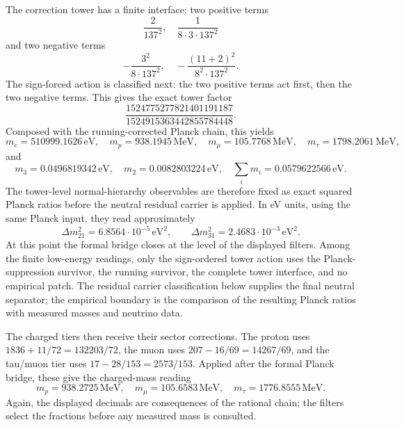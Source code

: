 \documentclass[11pt]{article}
\begin{document}
The correction tower has a finite interface: two positive terms
\[
  \frac{2}{137^2},\quad \frac{1}{8\cdot 3\cdot 137^2}
\]
and two negative terms
\[
  -\frac{3^2}{8\cdot 137^2},\quad
  -\frac{(11+2)^2}{8^2\cdot 137^2}.
\]
The sign-forced action is classified next: the two positive terms act
first, then the two negative terms.  This gives the exact tower factor
\[
  \frac{1524775277821401191187}{1524915363442855784448}.
\]
Composed with the running-corrected Planck chain, this yields
\[
  m_e = 510999.1626\,\mathrm{eV},\quad
  m_p = 938.1945\,\mathrm{MeV},\quad
  m_\mu = 105.7768\,\mathrm{MeV},\quad
  m_\tau = 1798.2061\,\mathrm{MeV},
\]
and
\[
  m_3 = 0.0496819342\,\mathrm{eV},\quad
  m_2 = 0.0082803224\,\mathrm{eV},\quad
  \sum_i m_i = 0.0579622566\,\mathrm{eV}.
\]
The tower-level normal-hierarchy observables are therefore fixed as exact
squared Planck ratios before the neutral residual carrier is applied.  In
eV units, using the same Planck input, they read approximately
\[
  \Delta m^2_{21} = 6.8564\cdot 10^{-5}\,\mathrm{eV}^2,
  \qquad
  \Delta m^2_{31} = 2.4683\cdot 10^{-3}\,\mathrm{eV}^2.
\]
At this point the formal bridge closes at the level of the displayed
filters.  Among the finite low-energy readings, only the sign-ordered
tower action uses the Planck-suppression survivor, the running survivor,
the complete tower interface, and no empirical patch.  The residual
carrier classification below supplies the final neutral separator; the
empirical boundary is the comparison of the resulting Planck ratios with
measured masses and neutrino data.

The charged tiers then receive their sector corrections.  The proton
uses $1836 + 11/72 = 132203/72$, the muon uses
$207 - 16/69 = 14267/69$, and the tau/muon tier uses
$17 - 28/153 = 2573/153$.  Applied after the formal Planck bridge, these
give the charged-mass reading
\[
  m_p = 938.2725\,\mathrm{MeV},\quad
  m_\mu = 105.6583\,\mathrm{MeV},\quad
  m_\tau = 1776.8555\,\mathrm{MeV}.
\]
Again, the displayed decimals are consequences of the rational chain;
the filters select the fractions before any measured mass is consulted.
\end{document}
